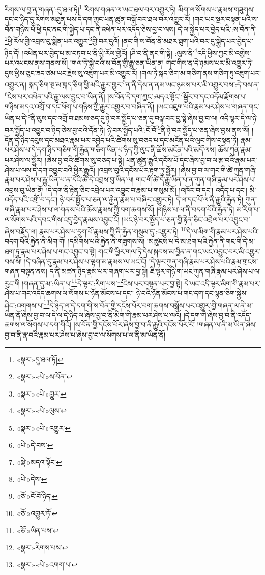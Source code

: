 རིགས་ལ་བྱ་ན་གཞན་:དུ་ཐལ་ཏེ།\footnote{«སྣར་»དུ་ཐལ་ཏོ།} རིགས་གཞན་ལ་ཡང་ཐལ་བར་འགྱུར་ཏེ། མིག་ལ་སོགས་པ་རྣམས་གཟུགས་དང་བ་ཉིད་དུ་རིགས་མཐུན་པས་དེ་དག་ཀྱང་ཕན་ཚུན་བསྒོ་བར་ཐལ་བར་འགྱུར་རོ། །གང་ཡང་སྔར་བསྟན་པའི་ས་བོན་གཉིས་པོ་ཕྱི་དང་ནང་གི་སྐྱེད་པ་དང་ནི་འཕེན་པར་འདོད་ཅེས་བྱ་བ་ལས། དེ་ལ་སྐྱེད་པར་བྱེད་པའི་:ས་བོན་ནི་\footnote{«སྣར་»«པེ་»ས་བོན་}ཕྱི་རོལ་གྱི་འབྲས་བུ་སྨིན་པར་འགྱུར་\footnote{«སྣར་»«པེ་»གྱུར་}གྱི་བར་དུའོ། །ནང་གི་ས་བོན་ནི་མཐར་ཐུག་པའི་བར་དུ་སྐྱེད་པར་བྱེད་པ་ཉིད་དོ། །འཕེན་པར་བྱེད་པ་མ་བཏབ་པ་ནི་ཕྱི་རོལ་གྱིའོ། །ཤི་བ་ནི་ནང་གི་སྟེ། :ལུས་ནི་\footnote{«སྣར་»«པེ་»ལུས་}འདི་ཕྱིས་ཀྱང་མི་འགྱེས་པར་འཕངས་ནས་གནས་སོ། །གལ་ཏེ་སྐྱེ་བའི་ས་བོན་གྱི་རྒྱུ་ཅན་ཡིན་ན། གང་གིས་ན་དེ་ཉམས་པར་མི་འགྱུར་ཏེ། དུས་ཕྱིས་ཅུང་ཟད་ཙམ་ཡང་རྗེས་སུ་འཇུག་པར་མི་འགྱུར་རོ། །གལ་ཏེ་སྐད་ཅིག་མ་གཅིག་ནས་གཅིག་ཏུ་འཇུག་པར་འགྱུར་ན། སྐད་ཅིག་སྔ་མ་སྐད་ཅིག་ཕྱི་མའི་རྒྱུར་གྱུར་\footnote{«སྣར་»«པེ་»འགྱུར་}ན་ནི་དེས་ན་ནམ་ཡང་ཉམས་པར་མི་འགྱུར་བས་:དེ་བས་ན་\footnote{«པེ་»དེ་བས་}ངེས་པར་འཕེན་པའི་རྒྱུ་ལས་བྱུང་བ་ཡིན་ནོ། །ས་བོན་དེ་དག་ཀྱང་:མདའ་སྟོང་\footnote{«སྡེ་»མདའ་ལྟོང་}སྦྱོར་བ་དང་འདོམ་རྫོགས་པ་གཉིས་མདའ་འགྲོ་བ་དང་ཕོག་པ་གཉིས་ཀྱི་རྒྱུར་འགྱུར་བ་བཞིན་ནོ། །ཡང་འཇུག་པའི་རྣམ་པར་ཤེས་པ་གཞན་གང་ཡིན་པ་དེ་\footnote{«པེ་»དེས་}ནི་ལུས་དང་འགྲོ་བ་ཐམས་ཅད་དུ་ཉེ་བར་སྤྱོད་པ་ཅན་དུ་བལྟ་བར་བྱ་སྟེ་ཞེས་བྱ་བ་ལ། འདི་ལྟར་དེ་ལ་ཉེ་བར་སྤྱོད་པ་འབྱུང་བ་ཉིད་ཅེས་བྱ་བའི་དོན་ཏེ། ཉེ་བར་སྤྱོད་པའི་:ངོ་བོ་\footnote{«ཅོ་»ངོ་བོ་ཉིད་}ནི་ཉེ་བར་སྤྱོད་པ་ཅན་ཞེས་བྱས་ནས་སོ། །དོན་དེ་ཉིད་དབུས་དང་མཐའ་རྣམ་པར་འབྱེད་པའི་ཚིགས་སུ་བཅད་པ་དང་མངོན་པའི་ལུང་གིས་བསྟན་ཏེ། རྣམ་པར་ཤེས་པ་དེ་དག་ཉིད་གཅིག་གི་རྐྱེན་གཅིག་ཡིན་པ་ཉིད་ཀྱི་ལུང་ནི་ཆོས་མངོན་པའི་མདོ་ལས། ཆོས་ཀུན་རྣམ་པར་ཤེས་ལ་སྦྱོར། །ཞེས་བྱ་བའི་ཚིགས་སུ་བཅད་པ་སྟེ། ཕན་ཚུན་རྒྱུའི་དངོས་པོ་དང་ཞེས་བྱ་བ་ལ་རྩ་བའི་རྣམ་པར་ཤེས་པ་ལས་དེ་དག་འབྱུང་བའི་ཕྱིར་རྒྱུའོ། །འབྲས་བུའི་དངོས་པོར་རྟག་ཏུ་སྦྱོར། །ཞེས་བྱ་བ་ལ་གང་གི་ཚེ་ཀུན་གཞི་རྣམ་པར་ཤེས་པ་རྒྱུ་ཡིན་པ་ན་དེའི་ཚེ་དེ་འབྲས་བུ་ཡིན་ལ། གང་གི་ཚེ་དེ་རྒྱུ་ཡིན་པ་ན་ཀུན་གཞི་རྣམ་པར་ཤེས་པ་འབྲས་བུ་ཡིན་ནོ། །དེ་དག་ནི་རྟེན་ཅིང་འབྲེལ་པར་འབྱུང་བ་རྣམ་པ་གསུམ་མོ། །འཁོར་བ་དང་། འདོད་པ་དང་། མི་འདོད་པའི་འགྲོ་བ་དང་། ཉེ་བར་སྤྱོད་པ་ཅན་ལ་རྐྱེན་རྣམ་པ་བཞིར་འགྱུར་ཏེ། དེ་ལ་དང་པོ་ལ་ནི་རྒྱུའི་རྐྱེན་ཏེ། ཀུན་གཞི་རྣམ་པར་ཤེས་པ་ལ་གནས་པའི་ཆོས་རྣམས་ཀྱི་བག་ཆགས་སོ། །གཉིས་པ་ལ་ནི་བདག་པོའི་རྐྱེན་ཏེ། མ་རིག་པ་ལ་སོགས་པའི་དབང་གིས་འདུ་བྱེད་རྣམས་འབྱུང་ངོ། །ཡང་ཉེ་བར་སྤྱོད་པ་ཅན་གྱི་རྟེན་ཅིང་འབྲེལ་པར་འབྱུང་བ་ཞེས་བརྗོད་ལ། རྣམ་པར་ཤེས་པ་དྲུག་པོ་རྣམས་ཀྱི་ནི་རྐྱེན་གསུམ་དུ་:འགྱུར་ཏེ། \footnote{«ཅོ་»འགྱུར་ཏོ་}དེ་ལ་མིག་གི་རྣམ་པར་ཤེས་པའི་བདག་པོའི་རྐྱེན་ནི་མིག་གོ། །དམིགས་པའི་རྐྱེན་ནི་གཟུགས་སོ། །མཚུངས་པ་དེ་མ་ཐག་པའི་རྐྱེན་ནི་གང་གི་དེ་མ་ཐག་ཏུ་རྣམ་པར་ཤེས་པ་གང་འབྱུང་བ་སྟེ། གང་གི་ཕྱིར་གལ་ཏེ་དེས་སྐབས་མ་བྱིན་ན་གང་ཡང་འབྱུང་བར་མི་འགྱུར་བས་སོ། །དེ་བཞིན་དུ་རྣམ་པར་ཤེས་པ་ལྷག་མ་རྣམས་ལ་ཡང་ངོ། །དེ་ལྟར་ཀུན་གཞི་རྣམ་པར་ཤེས་པའི་རྣམ་གྲངས་གཞན་བསྟན་ནས། ད་ནི་མཚན་ཉིད་རྣམ་པར་གཞག་པར་བྱ་སྟེ། ཇི་ལྟར་གཉི་ག་ཡང་ཀུན་གཞི་རྣམ་པར་ཤེས་པ་ལ་རུང་གི །གཞན་དུ་མ་:ཡིན་པ་\footnote{«ཅོ་»ཡིན་པས་}དེ་ལྟར་:རིག་པས་\footnote{«སྣར་»རིགས་པས་}ངེས་པར་བསྟན་པར་བྱ་སྟེ། དེ་ཡང་འདི་ལྟར་མིག་གི་རྣམ་པར་ཤེས་པ་གང་འདོད་ཆགས་ལ་སོགས་པ་ཉོན་མོངས་པ་དང་། ཉེ་བའི་ཉོན་མོངས་པ་གང་དག་དང་ལྷན་ཅིག་སྐྱེས་ཤིང་:འགགས་པ་\footnote{«སྣར་»«པེ་»འགག་པ་}དེ་ཉིད་ལ་དེ་དག་གི་ས་བོན་གྱི་དངོས་པོར་བག་ཆགས་བསྒོས་པར་འགྱུར་གྱི་གཞན་ལ་ནི་མ་ཡིན་ནོ་ཞེས་བྱ་བ་ལ་དེ་ལ་དེ་ཉིད་ལ་ཞེས་བྱ་བ་ནི་མིག་གི་རྣམ་པར་ཤེས་པ་ལའོ། །དེ་དག་གི་ཞེས་བྱ་བ་ནི་འདོད་ཆགས་ལ་སོགས་པ་དག་གིའོ། །ས་བོན་གྱི་དངོས་པོར་ཞེས་བྱ་བ་ནི་རྒྱུའི་དངོས་པོར་རོ། །གཞན་ལ་ནི་མ་ཡིན་ཞེས་བྱ་བ་ནི་རྣ་བའི་རྣམ་པར་ཤེས་པ་ཞེས་བྱ་བ་ལ་སོགས་པ་ལ་ནི་མ་ཡིན་ནོ། 
